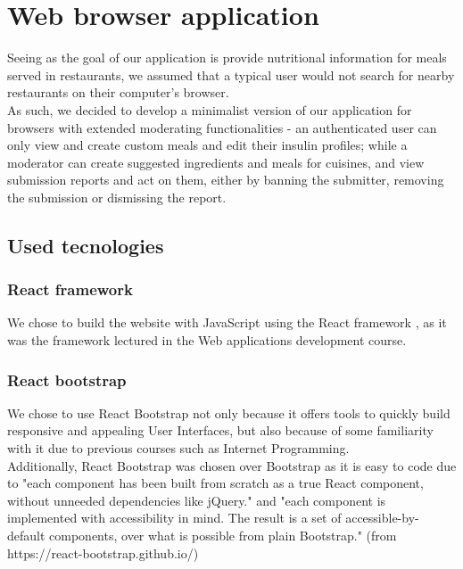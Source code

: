 \section{Web browser application}

Seeing as the goal of our application is provide nutritional information for meals served in restaurants,
we assumed that a typical user would not search for nearby restaurants on their computer's browser.\\

As such, we decided to develop a minimalist version of our application for browsers with extended moderating functionalities -
an authenticated user can only view and create custom meals and edit their insulin profiles; while a moderator can create suggested ingredients
and meals for cuisines, and view submission reports and act on them, either by banning the submitter, removing the submission or dismissing the report.\\

\subsection{Used tecnologies}

\subsubsection{React framework}

We chose to build the website with JavaScript \cite{javascript} using the React framework \cite{react} , as it was the framework lectured in the Web applications
development course.

\subsubsection{React bootstrap}

We chose to use React Bootstrap not only because it offers tools to quickly build responsive and appealing User Interfaces,
but also because of some familiarity with it due to previous courses such as Internet Programming.\\

Additionally, React Bootstrap was chosen over Bootstrap as it is easy to code due to "each component has been built from scratch
as a true React component, without unneeded dependencies like jQuery." and "each component is implemented with accessibility in mind.
The result is a set of accessible-by-default components, over what is possible from plain Bootstrap."  (from https://react-bootstrap.github.io/)\\


